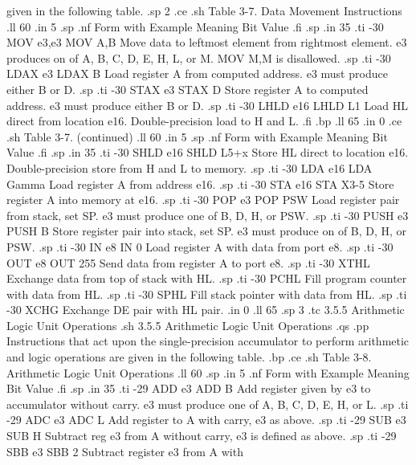 given in the following table.
.sp 2
.ce
.sh
Table 3-7.  Data Movement Instructions
.ll 60
.in 5
.sp
.nf
Form with      Example                 Meaning
Bit Value
.fi
.sp
.in 35
.ti -30
MOV e3,e3      MOV A,B        Move data to leftmost element from rightmost 
element.  e3 produces on of A, B, C, D, E, H, L, or M.  MOV M,M is 
disallowed.
.sp
.ti -30
LDAX e3        LDAX B         Load register A from computed address.  e3 must 
produce either B or D.
.sp
.ti -30
STAX e3        STAX D         Store register A to computed 
address.  e3 must produce either B or D.
.sp
.ti -30
LHLD e16       LHLD L1        Load HL direct from location 
e16.  Double-precision load to H and L.
.fi
.bp
.ll 65
.in 0
.ce
.sh
Table 3-7.  (continued)
.ll 60
.in 5
.sp
.nf
Form with      Example                 Meaning
Bit Value
.fi
.sp
.in 35
.ti -30
SHLD e16       SHLD L5+x      Store  HL  direct  to location e16.  
Double-precision store from H and L to memory.
.sp
.ti -30
LDA e16        LDA Gamma      Load register A from address e16.  
.sp
.ti -30
STA e16        STA X3-5       Store register A into memory 
at e16.
.sp
.ti -30
POP e3         POP PSW        Load register pair from stack, set SP.  
e3 must produce one of B, D, H, or PSW.
.sp
.ti -30
PUSH e3        PUSH B         Store register pair into stack, set SP.  e3 
must produce on of B, D, H, or PSW.
.sp
.ti -30
IN e8          IN 0           Load register A with data from port 
e8.
.sp
.ti -30
OUT e8         OUT 255        Send data from register A to port 
e8.
.sp
.ti -30
XTHL                          Exchange data from top of stack 
with HL.
.sp
.ti -30
PCHL                          Fill program counter with data from 
HL.
.sp
.ti -30
SPHL                          Fill stack pointer with data from 
HL.
.sp
.ti -30
XCHG                          Exchange DE pair with HL pair.
.in 0
.ll 65
.sp 3
.tc         3.5.5  Arithmetic Logic Unit Operations
.sh
3.5.5  Arithmetic Logic Unit Operations
.qs
.pp
Instructions that act upon the single-precision accumulator to 
perform arithmetic and logic operations are given in the 
following table.
.bp
.ce
.sh
Table 3-8.  Arithmetic Logic Unit Operations
.ll 60
.sp
.in 5
.nf
Form with       Example                Meaning
Bit Value
.fi
.sp
.in 35
.ti -29
ADD e3         ADD B         Add register given by e3 to 
accumulator without carry.  e3 must produce one of A, B, C, D, E, 
H, or L.
.sp
.ti -29
ADC e3         ADC L         Add register to A with carry, e3 as 
above.
.sp
.ti -29
SUB e3         SUB H         Subtract reg e3 from A without 
carry, e3 is defined as above.
.sp
.ti -29
SBB e3         SBB 2         Subtract register e3 from A with 
